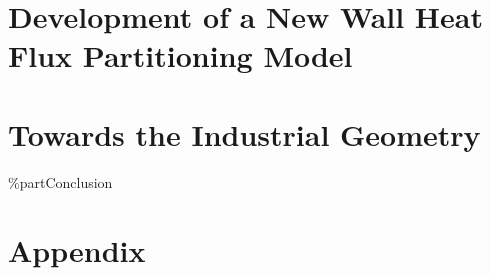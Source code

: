 


\cleardoublepage %


\part{Development of a New Wall Heat Flux Partitioning Model}









  






\cleardoublepage %


\part{Towards the Industrial Geometry}




\%part{Conclusion} %





\cleardoublepage %




\appendix

\part{Appendix} %





